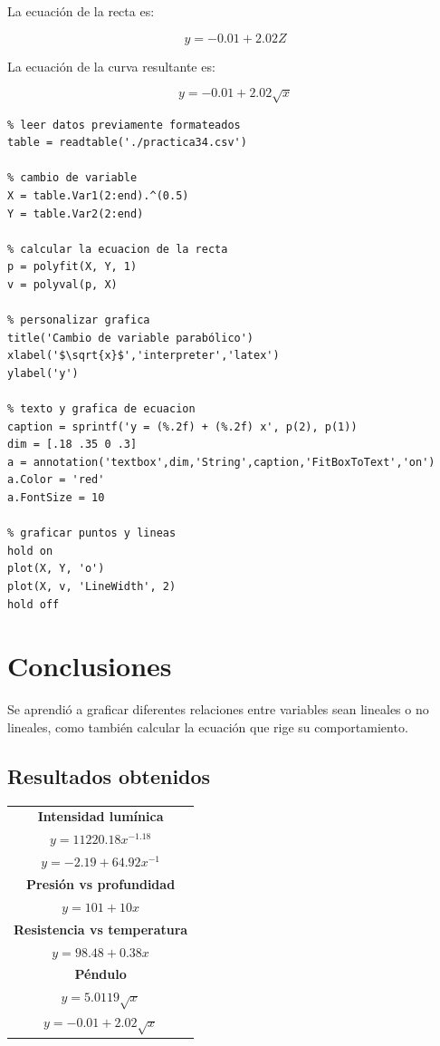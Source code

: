 \documentclass[letter,11pt]{article}
\begin{document}
La ecuación de la recta es:

\begin{equation}
    y = -0.01 + 2.02 Z
\end{equation}

La ecuación de la curva resultante es:

\begin{equation}
    y = -0.01 + 2.02 \sqrt{x}
\end{equation}

\footnotesize
\begin{verbatim}
% leer datos previamente formateados
table = readtable('./practica34.csv')

% cambio de variable
X = table.Var1(2:end).^(0.5)
Y = table.Var2(2:end)

% calcular la ecuacion de la recta
p = polyfit(X, Y, 1)
v = polyval(p, X)

% personalizar grafica
title('Cambio de variable parabólico')
xlabel('$\sqrt{x}$','interpreter','latex')
ylabel('y')

% texto y grafica de ecuacion
caption = sprintf('y = (%.2f) + (%.2f) x', p(2), p(1))
dim = [.18 .35 0 .3]
a = annotation('textbox',dim,'String',caption,'FitBoxToText','on')
a.Color = 'red'
a.FontSize = 10

% graficar puntos y lineas
hold on
plot(X, Y, 'o')
plot(X, v, 'LineWidth', 2)
hold off
\end{verbatim}
\normalsize

\section{Conclusiones}
Se aprendió a graficar diferentes relaciones entre variables sean lineales o
no lineales, como también calcular la ecuación que rige su comportamiento.

\subsection{Resultados obtenidos}

\begin{center}
\begin{tabular}{|c|c|}
\hline
\multicolumn{2}{|c|}{\textbf{Intensidad lumínica}} \\
\multicolumn{2}{|c|}{$y = 11220.18 x^{-1.18}$} \\
\multicolumn{2}{|c|}{$y = -2.19 + 64.92 x^{-1}$} \\
\hline
\multicolumn{2}{|c|}{\textbf{Presión vs profundidad}} \\
\multicolumn{2}{|c|}{$y = 101 + 10 x$} \\
\hline
\multicolumn{2}{|c|}{\textbf{Resistencia vs temperatura}} \\
\multicolumn{2}{|c|}{$y = 98.48 + 0.38 x$} \\
\hline
\multicolumn{2}{|c|}{\textbf{Péndulo}} \\
\multicolumn{2}{|c|}{$y = 5.0119 \sqrt{x}$} \\
\multicolumn{2}{|c|}{$y = -0.01 + 2.02 \sqrt{x}$} \\
\hline
\end{tabular}
\end{center}
\end{document}
